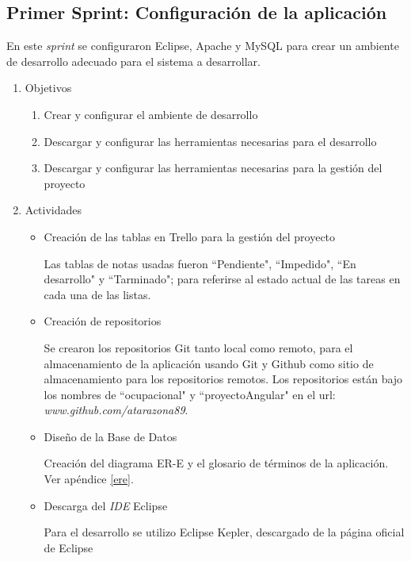     \subsection{Primer Sprint: Configuración de la aplicación}
    
    En este \textit{sprint} se configuraron Eclipse, Apache y MySQL para crear un ambiente de desarrollo adecuado para el sistema a desarrollar.
    
    \begin{enumerate}
        \item Objetivos
        \begin{enumerate}
            \item Crear y configurar el ambiente de desarrollo
            \item Descargar y configurar las herramientas necesarias para el desarrollo
            \item Descargar y configurar las herramientas necesarias para la gestión del proyecto         
        \end{enumerate}
        \item Actividades
        \begin{itemize}
            \item Creación de las tablas en Trello para la gestión del proyecto
            
            Las tablas de notas usadas fueron ``Pendiente", ``Impedido", ``En desarrollo" y ``Tarminado"; para referirse al estado actual de las tareas en cada una de las listas.
            
            \item Creación de repositorios
            
            Se crearon los repositorios Git tanto local como remoto, para el almacenamiento de la aplicación usando Git y Github como sitio de almacenamiento para los repositorios remotos. Los repositorios están bajo los nombres de ``ocupacional" y ``proyectoAngular" en el url: \textit{www.github.com/atarazona89}.
            
            \item Diseño de la Base de Datos
            
            Creación del diagrama ER-E y el glosario de términos de la aplicación. Ver apéndice \ref{ere}.
            
            \item Descarga del \textit{IDE} Eclipse
            
            Para el desarrollo se utilizo Eclipse Kepler, descargado de la página oficial de Eclipse\cite{ECLIPSE-eclipseorg}
            

\end{itemize}
\end{enumerate}
